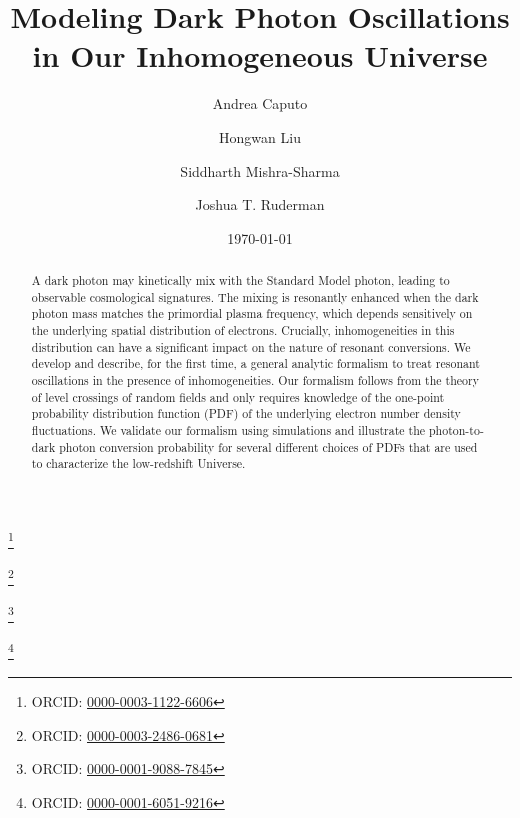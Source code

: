 \documentclass[prd,aps,10pt,nofootinbib,twocolumn,superscriptaddress,preprintnumbers,balancelastpage,longbibliography]{revtex4-1}
\begin{document}
\title{Modeling Dark Photon Oscillations in Our Inhomogeneous Universe}

\author{Andrea Caputo}
\thanks{ORCID: \href{https://orcid.org/0000-0003-1122-6606}{0000-0003-1122-6606}}

\author{Hongwan Liu}
\thanks{ORCID: \href{https://orcid.org/0000-0003-2486-0681}{0000-0003-2486-0681}}

\author{Siddharth Mishra-Sharma}
\thanks{ORCID: \href{https://orcid.org/0000-0001-9088-7845}{0000-0001-9088-7845}}

\author{Joshua T. Ruderman}
\thanks{ORCID: \href{https://orcid.org/0000-0001-6051-9216}{0000-0001-6051-9216}}

\date{\today}

\begin{abstract}
A dark photon may kinetically mix with the Standard Model photon, leading to observable cosmological signatures. The mixing is resonantly enhanced when the dark photon mass matches the primordial plasma frequency, which depends sensitively on the underlying spatial distribution of electrons. Crucially, inhomogeneities in this distribution can have a significant impact on the nature of resonant conversions. We develop and describe, for the first time, a general analytic formalism to treat resonant oscillations in the presence of inhomogeneities. Our formalism follows from the theory of level crossings of random fields and only requires knowledge of the one-point probability distribution function (PDF) of the underlying electron number density fluctuations. We validate our formalism using simulations and illustrate the photon-to-dark photon conversion probability for several different choices of PDFs that are used to characterize the low-redshift Universe. \githubmaster
\end{abstract}

\maketitle
\end{document}
